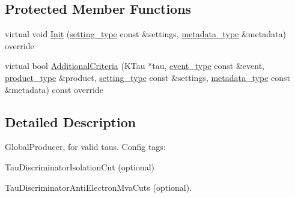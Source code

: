\subsection*{Protected Member Functions}
\begin{DoxyCompactItemize}
\item 
virtual void \hyperlink{classHttValidTausProducer_a42b501373453165f2a397c7d28b5409f}{Init} (\hyperlink{classHttValidTausProducer_a3c2e1acc4286eebbcdd76620d3f1fea7}{setting\_\-type} const \&settings, \hyperlink{classHttValidTausProducer_a6802826faf081861b7b2f89a8331a4a2}{metadata\_\-type} \&metadata) override
\item 
virtual bool \hyperlink{classHttValidTausProducer_a6bc6b7b7c64dd16441e8f0b9a368d729}{AdditionalCriteria} (KTau $\ast$tau, \hyperlink{classHttValidTausProducer_a3e20ad88591457e5cf707cf5992172ef}{event\_\-type} const \&event, \hyperlink{classHttValidTausProducer_a2a44fcab8ebc0f3bf907f4afcaaf3406}{product\_\-type} \&product, \hyperlink{classHttValidTausProducer_a3c2e1acc4286eebbcdd76620d3f1fea7}{setting\_\-type} const \&settings, \hyperlink{classHttValidTausProducer_a6802826faf081861b7b2f89a8331a4a2}{metadata\_\-type} const \&metadata) const override
\end{DoxyCompactItemize}


\subsection{Detailed Description}
GlobalProducer, for valid taus. Config tags:
\begin{DoxyItemize}
\item TauDiscriminatorIsolationCut (optional)
\item TauDiscriminatorAntiElectronMvaCuts (optional). 
\end{DoxyItemize}

